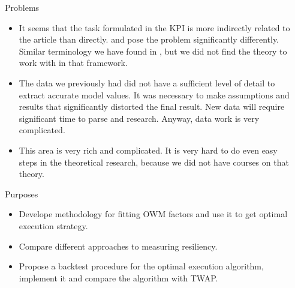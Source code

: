 \documentclass[]{beamer}
\begin{document}
\begin{frame}[t]
\begin{columns}[t]
    
    \begin{column}{\sepwid}\end{column} %
    
    \begin{column}{\onecolwid} %
    
        
        \begin{block}{Problems}
            \begin{itemize}
                \item It seems that the task formulated in the KPI is more indirectly related to the article \cite{obizhaeva2013optimal}
                than directly. \cite{obizhaeva2013optimal} and \cite{velu2020algorithmic} pose 
                the problem significantly differently. Similar terminology we have found in \cite{webster2023handbook}, but 
                we did not find the theory to work with in that framework.
                \item The data we previously had did not have a sufficient level of detail to extract accurate model values. 
                It was necessary to make assumptions and results that significantly distorted the final result. 
                New data will require significant time to parse and research. Anyway, data work is very complicated.
                \item This area is very rich and complicated. It is very hard to do even easy steps in the theoretical research, 
                because we did not have courses on that theory. 
                
            \end{itemize}

            
            \end{block}


        \begin{block}{Purposes}
        \begin{itemize}
            \item Develope methodology for fitting OWM factors and use it to get optimal execution strategy.
            \item Compare different approaches to measuring resiliency.
            \item Propose a backtest procedure for the optimal execution algorithm, implement it and compare the algorithm with TWAP.
        \end{itemize}
        

\end{block}
\end{column}
\end{columns}
\end{frame}
\end{document}
